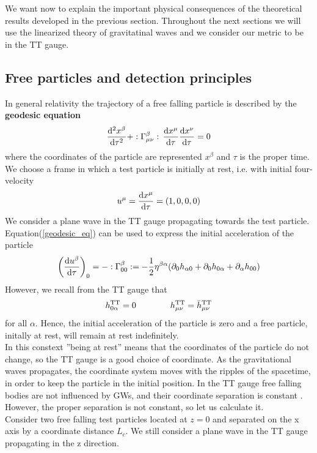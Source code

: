 We want now to explain the important physical consequences of the theoretical results developed in the previous section.
Throughout the next sections we will use the linearized theory of gravitatinal waves and we consider our metric to be in the TT gauge.
\subsection{Free particles and detection principles}
\label{free_particles_detection_principles}
In general relativity the trajectory of a free falling particle is described by the \textbf{geodesic equation}
\begin{equation}
\label{geodesic_eq}
\dv[2]{x^{\beta}}{\tau} + :\Gamma^{\beta} _{\mu \nu}: \,\dv{x^{\mu}}{\tau} \dv{x^{\nu}}{\tau} = 0
\end{equation}
where the coordinates of the particle are represented $x^{\beta}$ and $\tau$ is the proper time.\\
We choose a frame in which a test particle is initially at rest, i.e. with initial four-velocity
\[
u^{\mu} = \dv{x^{\mu}}{\tau} = (1,0,0,0)
\]
We consider a plane wave in the TT gauge propagating towards the test particle. \\
Equation(\ref{geodesic_eq}) can be used to express the initial acceleration of the particle
\[
\qty(
\dv{u^{\beta}}{\tau} 
)_{0}
=
- :\Gamma^{\beta} _{0 0}: 
= -\dfrac{1}{2} \eta ^{\beta \alpha}
\qty(
\partial_{0} h_{\alpha 0} + 
\partial_{0} h_{0 \alpha} + 
\partial_{\alpha} h_{0 0}
)
\]
However, we recall from the TT gauge that
\[
h^{\text{TT}}_{0 \alpha} = 0 \qquad  \qquad h^{\text{TT}}_{\mu \nu} = \bar{h}^{\text{TT}}_{\mu \nu} 
\]
for all $\alpha$. Hence, the initial acceleration of the particle is zero and a free particle, initally at rest, will remain at rest indefinitely.\\
In this constext ''being at rest'' means that the coordinates of the particle do not change, so the TT gauge is a good choice of coordinate. As the gravitational waves propagates, the coordinate system moves with the ripples of the spacetime, in order to keep the particle in the initial position.
In the TT gauge free falling bodies are not influenced by  GWs, and their coordinate separation is constant \cite{martin_notes}.\\
However, the proper separation is not constant, so let us calculate it.\\
Consider two free falling test particles located at $z=0$ and separated on the x axis by a coordinate distance $L_c$. We still consider a plane wave in the TT gauge propagating in the z direction.\\
